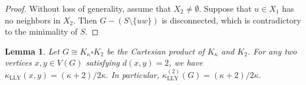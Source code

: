 \documentclass[10pt,a4paper]{article}
\newtheorem{lemma}{Lemma}[section]
\theoremstyle{definition}
\theoremstyle{definition}
\theoremstyle{nonumber}
\begin{document}
\begin{proof}
Without loss of generality, assume that $X_2\ne\emptyset$. Suppose that $u\in X_1$ has no neighbors in $X_2$. Then $G - (S \setminus \{uw\})$ is disconnected, which is contradictory to the minimality of $S$.
\end{proof}

\begin{lemma} \label{distance2}
Let $G\cong K_{\kappa}\square K_2$ be the Cartesian product of $K_{\kappa}$ and $K_2$.
For any two vertices $x,y\in V(G)$ satisfying $d(x,y)=2$, we have
$\kappa_{\mathrm{LLY}}(x,y)=(\kappa+2)/2\kappa.$
In particular, $\kappa_{\mathrm{LLY}}^{(2)}(G)=(\kappa+2)/2\kappa.$
\end{lemma}
\end{document}
